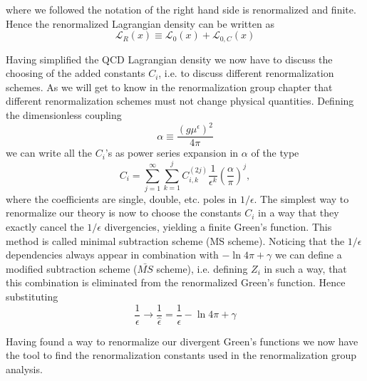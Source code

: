 where we followed the notation of \cite{PT84} the right hand side is renormalized and finite. Hence the renormalized Lagrangian density can be written as
\begin{equation}
	\mathcal{L}_R(x) \equiv \mathcal{L}_{0}(x) + \mathcal{L}_{0,C}(x)
\end{equation}
\par
Having simplified the QCD Lagrangian density we now have to discuss the choosing of the added constants $C_i$, i.e. to discuss different renormalization schemes. As we will get to know in the renormalization group chapter that different renormalization schemes must not change physical quantities. Defining the dimensionless coupling
\begin{equation}
	\alpha \equiv \frac{(g\mu^\epsilon)^2}{4\pi}
\end{equation}
we can write all the $C_i$'s as power series expansion in $\alpha$ of the type
\begin{equation}
	C_i = \sum^\infty_{j=1} \sum^j_{k=1} C^{(2j)}_{i,k} \frac{1}{\epsilon^k} \left(\frac{\alpha}{\pi}\right)^j,
\end{equation} 
where the coefficients are single, double, etc. poles in $1/\epsilon$. The simplest way to renormalize our theory is now to choose the constants $C_i$ in a way that they exactly cancel the $1/\epsilon$ divergencies, yielding a finite Green's function. This method is called minimal subtraction scheme (MS scheme). Noticing that the $1/\epsilon$ dependencies always appear in combination with $-\ln4\pi + \gamma$ we can define a modified subtraction scheme ($\bar{MS}$ scheme), i.e. defining $Z_i$ in such a way, that this combination is eliminated from the renormalized Green's function. Hence substituting
\begin{equation}
	\frac{1}{\epsilon} \rightarrow \frac{1}{\hat \epsilon} = \frac{1}{\epsilon} - \ln 4\pi + \gamma
\end{equation}
\par 
Having found a way to renormalize our divergent Green's functions we now have the tool to find the renormalization constants used in the renormalization group analysis.

